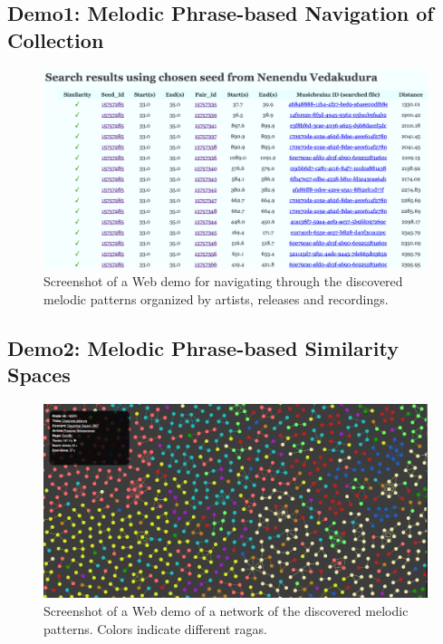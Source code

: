 \subsection*{Demo1: Melodic Phrase-based Navigation of Collection}


\begin{figure}
	\begin{center}
		\includegraphics[width=\figSizeHundred]{ch08_applications/figures/patternBrowsing1.png}
	\end{center}
	\caption{Screenshot of a Web demo for navigating through the discovered melodic patterns organized by artists, releases and recordings.}
	\label{fig:browser_patterns}
\end{figure}

\subsection*{Demo2: Melodic Phrase-based Similarity Spaces}

\begin{figure}
	\begin{center}
		\includegraphics[width=\figSizeHundred]{ch08_applications/figures/patternNetwork1.png}
	\end{center}
	\caption{Screenshot of a Web demo of a network of the discovered melodic patterns. Colors indicate different \glspl{raga}.}
	\label{fig:network_patterns}
\end{figure}



